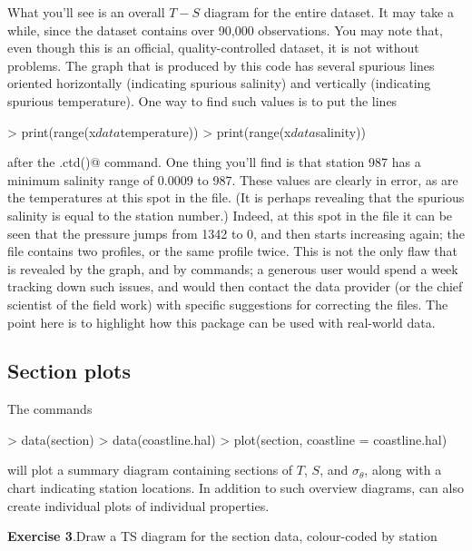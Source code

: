 \documentclass{article}
\newcommand{\workedexercise}[2]{
	\vspace{2ex plus 2ex minus 1ex}
	\begin{boxedminipage}[c]{0.95\linewidth}
		{\textbf{Exercise #1}.\hspace{1em}#2}
	\end{boxedminipage}
	\vspace{2ex plus 2ex minus 1ex}
}
\begin{document}
What you'll see is an overall $T-S$ diagram for the entire dataset. It may take
a while, since the dataset contains over 90,000 observations. You may note that,
even though this is an official, quality-controlled dataset, it is not without
problems. The graph that is produced by this code has several spurious lines
oriented horizontally (indicating spurious salinity) and vertically (indicating
spurious temperature). One way to find such values is to put the lines
\begin{Schunk}
\begin{Sinput}
> print(range(x$data$temperature))
> print(range(x$data$salinity))
\end{Sinput}
\end{Schunk}
after the \verb@read.ctd()@ command. One thing you'll find is that station 987
has a minimum salinity range of 0.0009 to 987. These values are clearly in
error, as are the temperatures at this spot in the file. (It is perhaps
revealing that the spurious salinity is equal to the station number.) Indeed, at
this spot in the file it can be seen that the pressure jumps from 1342 to 0, and
then starts increasing again; the file contains two profiles, or the same
profile twice. This is not the only flaw that is revealed by the graph, and by
\verb@range@ commands; a generous user would spend a week tracking down such
issues, and would then contact the data provider (or the chief scientist of the
field work) with specific suggestions for correcting the files. The point here
is to highlight how this package can be used with real-world data.

\subsection{Section plots}
The commands
\begin{Schunk}
\begin{Sinput}
> data(section)
> data(coastline.hal)
> plot(section, coastline = coastline.hal)
\end{Sinput}
\end{Schunk}
will plot a summary diagram containing sections of
$T$, $S$, and $\sigma_\theta$, along with a chart indicating station
locations. In addition to such overview diagrams, \verb@plot@ can also create
individual plots of individual properties.

\workedexercise{3}{Draw a TS diagram for the section data, colour-coded by station}

\end{document}
